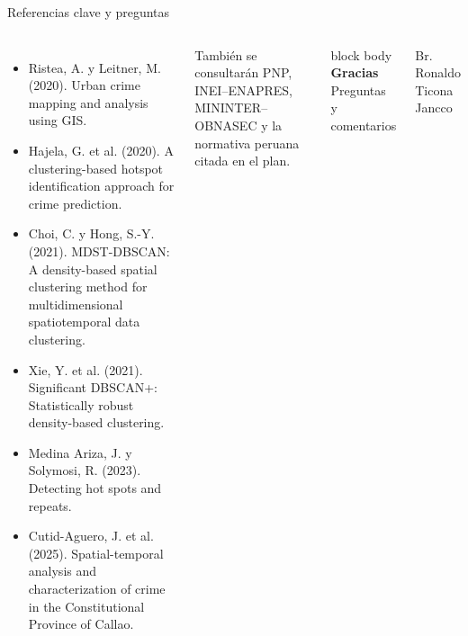 \documentclass[aspectratio=169,10pt]{beamer}
\begin{document}
\begin{frame}{Referencias clave y preguntas}
  \begin{columns}[T,onlytextwidth]
      \footnotesize
      \begin{itemize}
        \item Ristea, A. y Leitner, M. (2020). Urban crime mapping and analysis using GIS.
        \item Hajela, G. et al. (2020). A clustering-based hotspot identification approach for crime prediction.
        \item Choi, C. y Hong, S.-Y. (2021). MDST-DBSCAN: A density-based spatial clustering method for multidimensional spatiotemporal data clustering.
        \item Xie, Y. et al. (2021). Significant DBSCAN+: Statistically robust density-based clustering.
        \item Medina Ariza, J. y Solymosi, R. (2023). Detecting hot spots and repeats.
        \item Cutid-Aguero, J. et al. (2025). Spatial-temporal analysis and characterization of crime in the Constitutional Province of Callao.
      \end{itemize}
      \vspace{.1cm}
      \scriptsize También se consultarán PNP, INEI--ENAPRES, MININTER--OBNASEC y la normativa peruana citada en el plan.
      \begin{beamercolorbox}[rounded=true,sep=1em,center,wd=\textwidth]{block body}
        {\color{TesisVerde}\Large\bfseries Gracias}\\[.35cm]
        {\large Preguntas y comentarios}
      \end{beamercolorbox}
      \vspace{.3cm}
      \centering\small Br. Ronaldo Ticona Jancco
  \end{columns}
\end{frame}
\end{document}
